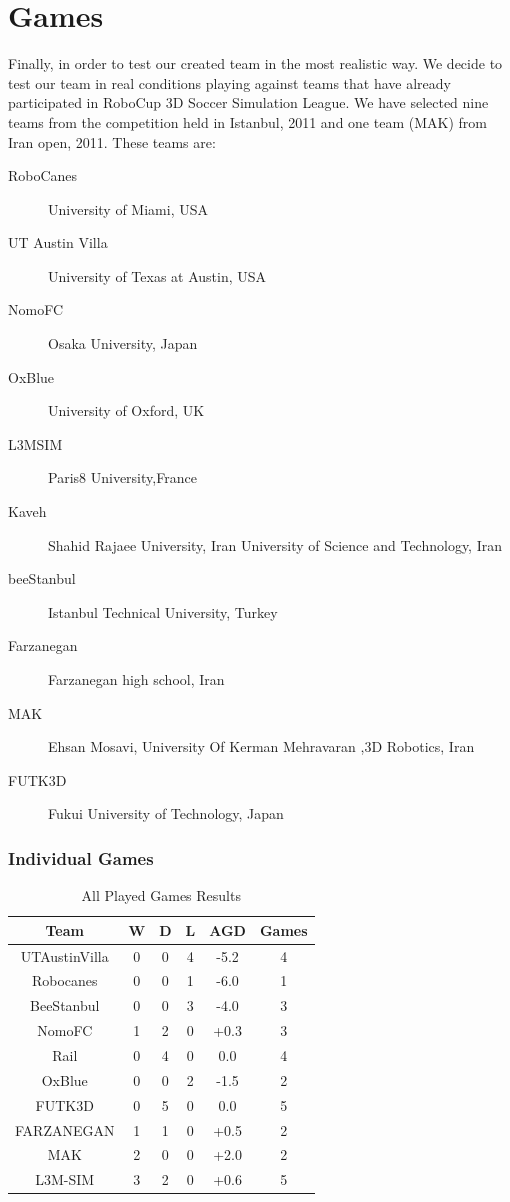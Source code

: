 \section{Games}
Finally, in order to test our created team in the most realistic way. We decide to test our team in real conditions playing against teams that have already participated in RoboCup 3D Soccer Simulation League. We have selected nine teams from the competition held in Istanbul, 2011 and one team (MAK) from Iran open, 2011. These teams are:
\begin{description}
\item[RoboCanes]	University of Miami, USA 
\item[UT Austin Villa]	University of Texas at Austin, USA
\item[NomoFC]	Osaka University, Japan
\item[OxBlue]	University of Oxford, UK
\item[L3MSIM]	Paris8 University,France
\item[Kaveh] 	Shahid Rajaee University, Iran University of Science and Technology, Iran
\item[beeStanbul]	Istanbul Technical University, Turkey
\item[Farzanegan]	Farzanegan high school, Iran
\item[MAK]	Ehsan Mosavi, University Of Kerman Mehravaran ,3D Robotics, Iran
\item[FUTK3D]	Fukui University of Technology, Japan
\end{description}

\subsubsection*{Individual Games}

\begin{table}[t!]
\caption{All Played Games Results}
\label{GameResults}
\begin{center}
    \begin{tabular}{cccccc}
    \textbf{Team} 	& \textbf{W} & \textbf{D} & \textbf{L} & \textbf{AGD}\footnotemark 	& \textbf{Games}   \\
    \midrule
    UTAustinVilla 	& 0		& 0		& 4		& -5.2		& 4 			\\
    Robocanes 		& 0		& 0		& 1		& -6.0		& 1 			\\
    BeeStanbul		& 0		& 0		& 3		& -4.0		& 3				\\
    NomoFC 			& 1		& 2		& 0		& +0.3 		& 3 			\\
    Rail 			& 0		& 4		& 0		& 0.0 		& 4 			\\
    OxBlue 			& 0		& 0		& 2		& -1.5 		& 2 			\\
    FUTK3D 			& 0		& 5		& 0		& 0.0 		& 5 			\\
    FARZANEGAN 		& 1		& 1		& 0		& +0.5 		& 2 			\\
    MAK 		    & 2		& 0		& 0		& +2.0 		& 2 			\\
    L3M-SIM			& 3		& 2   	& 0		& +0.6 		& 5 			\\     
    \end{tabular}
\end{center}
\end{table}



